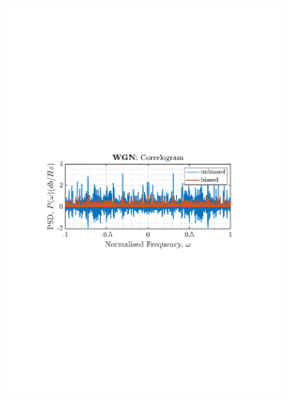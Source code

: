 \documentclass[12pt]{article}
\begin{document}
\begin{figure}[H]
\begin{subfigure}{0.49\textwidth}
			\includegraphics[trim={2.2cm 11cm 3.15cm  11.2cm}, clip, width=\textwidth]{../MATLAB/figures/q1_3a_fig01.pdf} 
		\end{subfigure}
		\begin{subfigure}{0.49\textwidth}
			\centering

\end{subfigure}
\end{figure}
\end{document}
